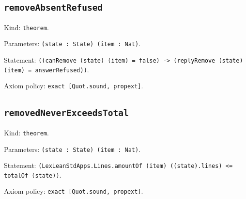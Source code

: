 \documentclass[11pt]{article}
\begin{document}
\subsection*{\texttt{removeAbsentRefused}}
\noindent Kind: \texttt{theorem}.\par
\noindent Parameters: \texttt{(state : State) (item : Nat)}.\par
\noindent Statement: \texttt{((canRemove (state) (item) = false) -> (replyRemove (state) (item) = answerRefused))}.\par
\noindent Axiom policy: \texttt{exact [Quot.sound, propext]}.\par
\subsection*{\texttt{removedNeverExceedsTotal}}
\noindent Kind: \texttt{theorem}.\par
\noindent Parameters: \texttt{(state : State) (item : Nat)}.\par
\noindent Statement: \texttt{(LexLeanStdApps.Lines.amountOf (item) ((state).lines) <= totalOf (state))}.\par
\noindent Axiom policy: \texttt{exact [Quot.sound, propext]}.\par
\end{document}
